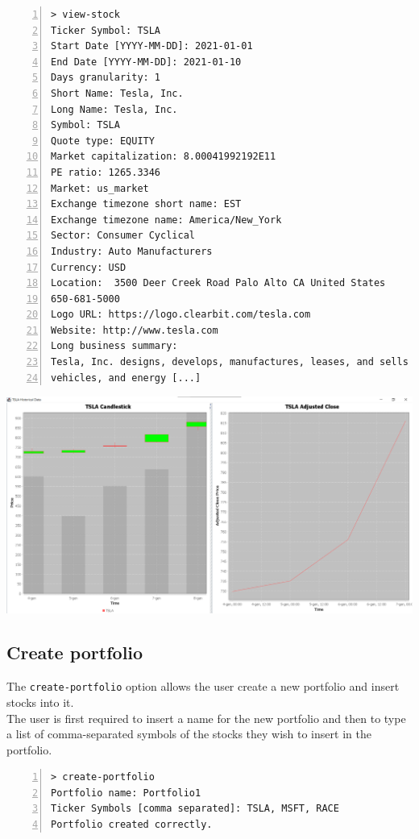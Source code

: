 \begin{lstlisting}[basicstyle=\footnotesize\ttfamily,language={},numbers=left,keepspaces=true,tabsize=4,
numberstyle=\footnotesize,numbersep=8pt,frame=single]
> view-stock
Ticker Symbol: TSLA
Start Date [YYYY-MM-DD]: 2021-01-01
End Date [YYYY-MM-DD]: 2021-01-10
Days granularity: 1
Short Name: Tesla, Inc.
Long Name: Tesla, Inc.
Symbol: TSLA
Quote type: EQUITY
Market capitalization: 8.00041992192E11
PE ratio: 1265.3346
Market: us_market
Exchange timezone short name: EST
Exchange timezone name: America/New_York
Sector: Consumer Cyclical
Industry: Auto Manufacturers
Currency: USD
Location:  3500 Deer Creek Road Palo Alto CA United States
650-681-5000
Logo URL: https://logo.clearbit.com/tesla.com
Website: http://www.tesla.com
Long business summary:
Tesla, Inc. designs, develops, manufactures, leases, and sells electric
vehicles, and energy [...]
\end{lstlisting}

\hfill \break
{\centering
\includegraphics[scale=0.32]{img/user_manual/view_stock.png}\\
}

\subsection{Create portfolio}
The \texttt{create-portfolio} option allows the user create a new portfolio and insert stocks into it.\\
The user is first required to insert a name for the new portfolio and then to type a list of comma-separated symbols of the stocks they wish to insert in the portfolio.

\begin{lstlisting}[basicstyle=\footnotesize\ttfamily,language={},numbers=left,keepspaces=true,tabsize=4,
numberstyle=\footnotesize,numbersep=8pt,frame=single]
> create-portfolio
Portfolio name: Portfolio1
Ticker Symbols [comma separated]: TSLA, MSFT, RACE
Portfolio created correctly.

\end{lstlisting}

